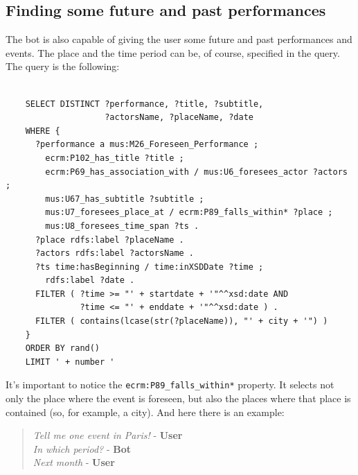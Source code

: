 \documentclass[a4paper,12pt]{report}
\begin{document}
	\subsection{Finding some future and past performances}
	The bot is also capable of giving the user some future and past performances and events. The place and the time period can be, of course, specified in the query. The query is the following:
	\begin{lstlisting}
	
	SELECT DISTINCT ?performance, ?title, ?subtitle,
	                ?actorsName, ?placeName, ?date
	WHERE {
	  ?performance a mus:M26_Foreseen_Performance ;
	    ecrm:P102_has_title ?title ;
	    ecrm:P69_has_association_with / mus:U6_foresees_actor ?actors ;
	    mus:U67_has_subtitle ?subtitle ;
	    mus:U7_foresees_place_at / ecrm:P89_falls_within* ?place ;
	    mus:U8_foresees_time_span ?ts .
	  ?place rdfs:label ?placeName .
	  ?actors rdfs:label ?actorsName .
	  ?ts time:hasBeginning / time:inXSDDate ?time ;
 	    rdfs:label ?date .
	  FILTER ( ?time >= "' + startdate + '"^^xsd:date AND
	           ?time <= "' + enddate + '"^^xsd:date ) .
	  FILTER ( contains(lcase(str(?placeName)), "' + city + '") )
	}
	ORDER BY rand()
	LIMIT ' + number '
	\end{lstlisting}
	It's important to notice the \texttt{ecrm:P89_falls_within*} property. It selects not only the place where the event is foreseen, but also the places where that place is contained (so, for example, a city). And here there is an example:
	\begin{verse}
		\textit{Tell me one event in Paris!} - \textbf{User}\\
		\textit{In which period?} - \textbf{Bot}\\
		\textit{Next month} - \textbf{User}\\
	\end{verse}
\end{document}
